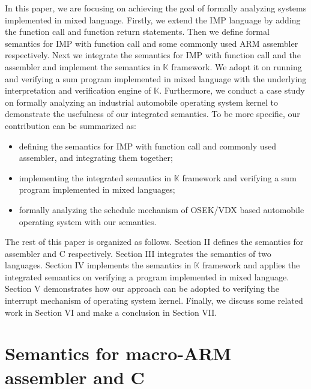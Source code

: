 \documentclass[conference]{IEEEtran}
\begin{document}
 In this paper, we are focusing on achieving the goal of formally analyzing systems implemented in mixed language. Firstly, we extend the IMP language by adding the function call and function return statements. Then we define formal semantics for IMP with function call and some commonly used ARM assembler respectively. Next we integrate the semantics for IMP with function call and the assembler and implement the semantics in $\mathbb{K}$ framework. We adopt it on running and verifying a sum program implemented in mixed language with the underlying interpretation and verification engine of $\mathbb{K}$. Furthermore, we conduct a case study on formally analyzing an industrial automobile operating system kernel to demonstrate the usefulness of our integrated semantics. To be more specific, our contribution can be summarized as:
\begin{itemize}
	\item defining the semantics for IMP with function call and commonly used assembler, and integrating them together;
	\item implementing the integrated semantics in $\mathbb{K}$ framework and verifying a sum program implemented in mixed languages;
	\item formally analyzing the schedule mechanism of OSEK/VDX based automobile operating system with our semantics.
\end{itemize}

 The rest of this paper is organized as follows. Section II defines the semantics for assembler and C respectively. Section III integrates the semantics of two languages. Section IV implements the semantics in $\mathbb{K}$ framework and applies the integrated semantics on verifying a program implemented in mixed language. Section V demonstrates how our approach can be adopted to verifying the interrupt mechanism of operating system kernel. Finally, we discuss some related
 work in Section VI and make a conclusion in Section VII.

\section{Semantics for macro-ARM assembler and C}
\end{document}
